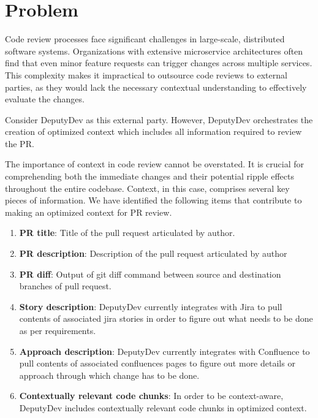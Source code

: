 \section{Problem}
Code review processes face significant challenges in large-scale, distributed software systems. Organizations with extensive microservice architectures often find that even minor feature requests can trigger changes across multiple services. This complexity makes it impractical to outsource code reviews to external parties, as they would lack the necessary contextual understanding to effectively evaluate the changes.

Consider DeputyDev as this external party. However, DeputyDev orchestrates the creation of optimized context which includes all information required to review the PR.

The importance of context in code review cannot be overstated. It is crucial for comprehending both the immediate changes and their potential ripple effects throughout the entire codebase. Context, in this case, comprises several key pieces of information. We have identified the following items that contribute to making an optimized context for PR review.

\begin{enumerate}
    \item \textbf{PR title}: Title of the pull request articulated by author.
    \item \textbf{PR description}: Description of the pull request articulated by author
    \item \textbf{PR diff}: Output of git diff command between source and destination branches of pull request.
    \item \textbf{Story description}: DeputyDev currently integrates with Jira to pull contents of associated jira stories in order to figure out what needs to be done as per requirements.
    \item \textbf{Approach description}: DeputyDev currently integrates with Confluence to pull contents of associated confluences pages to figure out more details or approach through which change has to be done.
    \item \textbf{Contextually relevant code chunks}: In order to be context-aware, DeputyDev includes contextually relevant code chunks in optimized context.
\end{enumerate}